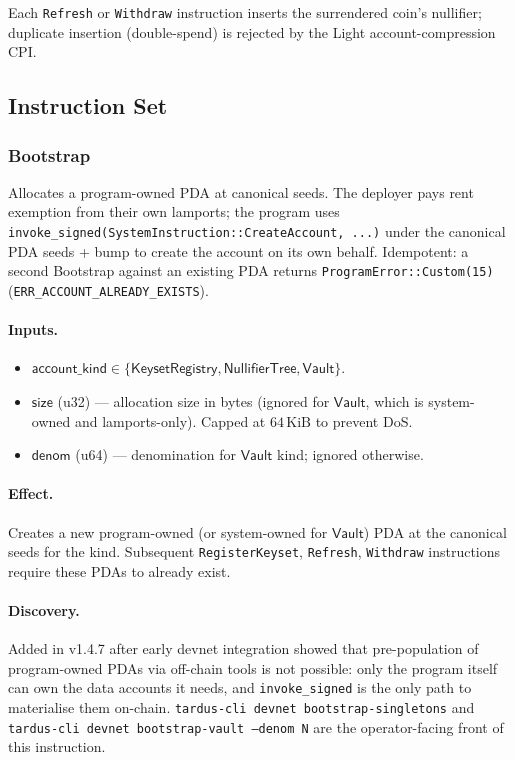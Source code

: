 Each \texttt{Refresh} or \texttt{Withdraw} instruction inserts the surrendered coin's nullifier; duplicate insertion (double-spend) is rejected by the Light account-compression CPI.

\subsection{Instruction Set}
\label{sec:onchain-instructions}

\subsubsection{Bootstrap}
\label{sec:onchain-instr-bootstrap}

Allocates a program-owned PDA at canonical seeds. The deployer pays
rent exemption from their own lamports; the program uses
\verb|invoke_signed(SystemInstruction::CreateAccount, ...)| under the
canonical PDA seeds + bump to create the account on its own behalf.
Idempotent: a second Bootstrap against an existing PDA returns
\verb|ProgramError::Custom(15)| (\texttt{ERR\_ACCOUNT\_ALREADY\_EXISTS}).

\paragraph{Inputs.}
\begin{itemize}[leftmargin=2em,itemsep=0pt]
  \item $\mathsf{account\_kind} \in \{\mathsf{KeysetRegistry}, \mathsf{NullifierTree}, \mathsf{Vault}\}$.
  \item $\mathsf{size}$ (u32) --- allocation size in bytes
        (ignored for $\mathsf{Vault}$, which is system-owned and
        lamports-only). Capped at $64\,\mathrm{KiB}$ to prevent DoS.
  \item $\mathsf{denom}$ (u64) --- denomination for $\mathsf{Vault}$ kind;
        ignored otherwise.
\end{itemize}

\paragraph{Effect.} Creates a new program-owned (or system-owned for
$\mathsf{Vault}$) PDA at the canonical seeds for the kind. Subsequent
\texttt{RegisterKeyset}, \texttt{Refresh}, \texttt{Withdraw}
instructions require these PDAs to already exist.

\paragraph{Discovery.} Added in v1.4.7 after early devnet integration
showed that pre-population of program-owned PDAs via off-chain tools
is not possible: only the program itself can own the data accounts it
needs, and \verb|invoke_signed| is the only path to materialise them
on-chain. \texttt{tardus-cli devnet bootstrap-singletons} and
\texttt{tardus-cli devnet bootstrap-vault --denom N} are the
operator-facing front of this instruction.

